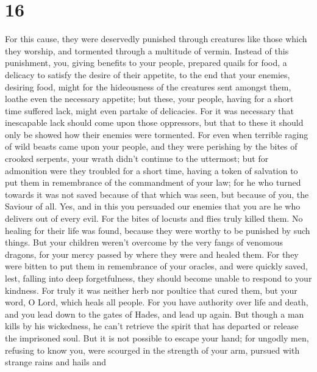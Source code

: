 \hypertarget{section-15}{%
\section{16}\label{section-15}}

 For this cause, they were deservedly punished through
creatures like those which they worship, and tormented through a
multitude of vermin.  Instead of this punishment, you,
giving benefits to your people, prepared quails for food, a delicacy to
satisfy the desire of their appetite,  to the end that your
enemies, desiring food, might for the hideousness of the creatures sent
amongst them, loathe even the necessary appetite; but these, your
people, having for a short time suffered lack, might even partake of
delicacies.  For it was necessary that inescapable lack
should come upon those oppressors, but that to these it should only be
showed how their enemies were tormented.  For even when
terrible raging of wild beasts came upon your people, and they were
perishing by the bites of crooked serpents, your wrath didn't continue
to the uttermost;  but for admonition were they troubled for
a short time, having a token of salvation to put them in remembrance of
the commandment of your law;  for he who turned towards it
was not saved because of that which was seen, but because of you, the
Saviour of all.  Yes, and in this you persuaded our enemies
that you are he who delivers out of every evil.  For the
bites of locusts and flies truly killed them. No healing for their life
was found, because they were worthy to be punished by such things.
 But your children weren't overcome by the very fangs of
venomous dragons, for your mercy passed by where they were and healed
them.  For they were bitten to put them in remembrance of
your oracles, and were quickly saved, lest, falling into deep
forgetfulness, they should become unable to respond to your kindness.
 For truly it was neither herb nor poultice that cured
them, but your word, O Lord, which heals all people.  For
you have authority over life and death, and you lead down to the gates
of Hades, and lead up again.  But though a man kills by his
wickedness, he can't retrieve the spirit that has departed or release
the imprisoned soul.  But it is not possible to escape your
hand;  for ungodly men, refusing to know you, were scourged
in the strength of your arm, pursued with strange rains and hails and
